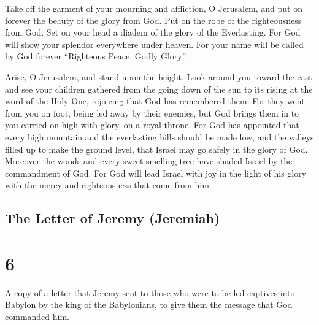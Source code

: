  Take off the garment of your mourning and affliction, O
Jerusalem, and put on forever the beauty of the glory from God.
 Put on the robe of the righteousness from God. Set on
your head a diadem of the glory of the Everlasting.  For
God will show your splendor everywhere under heaven.  For
your name will be called by God forever ``Righteous Peace, Godly
Glory''.

 Arise, O Jerusalem, and stand upon the height. Look
around you toward the east and see your children gathered from the going
down of the sun to its rising at the word of the Holy One, rejoicing
that God has remembered them.  For they went from you on
foot, being led away by their enemies, but God brings them in to you
carried on high with glory, on a royal throne.  For God
has appointed that every high mountain and the everlasting hills should
be made low, and the valleys filled up to make the ground level, that
Israel may go safely in the glory of God.  Moreover the
woods and every sweet smelling tree have shaded Israel by the
commandment of God.  For God will lead Israel with joy in
the light of his glory with the mercy and righteousness that come from
him.

\hypertarget{the-letter-of-jeremy-jeremiah}{%
\subsection{The Letter of Jeremy
(Jeremiah)}\label{the-letter-of-jeremy-jeremiah}}

\hypertarget{section-5}{%
\section{6}\label{section-5}}

 A copy of a letter that Jeremy sent to those who were to
be led captives into Babylon by the king of the Babylonians, to give
them the message that God commanded him.

